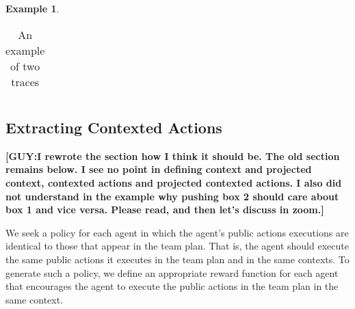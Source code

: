 \documentclass[letterpaper]{article} %
\theoremstyle{definition}
\newtheorem{example}{Example}
\newcommand{\guy}[1]{\textbf{[\color{orange}GUY:#1]}}
\begin{document}
\begin{example}
\begin{table}[ht]
\begin{tabular}{|c||c|c|c|c||c|c||c|c|}
    \end{tabular}
    \caption{An example of two traces}
    \label{tbl:Traces}
\end{table}
\end{example}


\subsection{Extracting Contexted Actions}
\guy{I rewrote the section how I think it should be. The old section remains below. I see no point in defining context and projected context, contexted actions and projected contexted actions. I also did not understand in the example why pushing box 2 should care about box 1 and vice versa. Please read, and then let's discuss in zoom.}

We seek a policy for each agent in which the agent's public actions executions are identical to those that appear in the team plan. That is, the agent should execute the same public actions it executes in the team plan and in the same contexts.
To generate such a policy, we define an appropriate reward function for each agent that encourages the agent to execute the public actions in the team plan in the same context.
\end{document}
